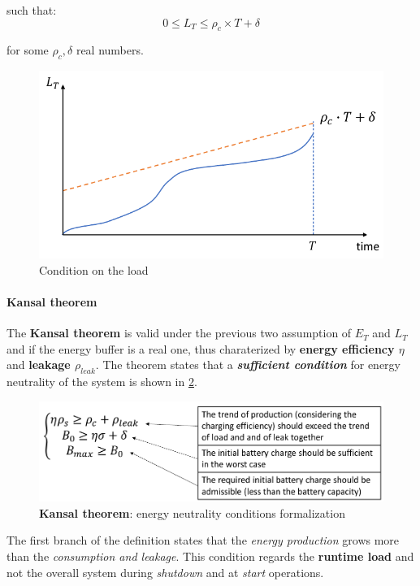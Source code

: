 \documentclass[10pt,a4paper]{report}
\theoremstyle{definition}
\begin{document}
such that:
\begin{equation}
	0 \le L_{T} \le \rho_{c} \times T+\delta
\end{equation}

for some $\rho_{c}, \delta$ real numbers.
\begin{figure}[h]
	\centering\includegraphics[scale=0.30]{images/Pasted image 20230510084605.png}
	\caption{Condition on the load}
	\label{kansal-cond2}
\end{figure}

\paragraph{Kansal theorem}
The \textbf{Kansal theorem} is valid under the previous two assumption of $E_{T}$ and $L_{T}$ and if the energy buffer is a real one, thus charaterized by \textbf{energy efficiency $\eta$} and \textbf{leakage $\rho_{leak}$}.
The theorem states that a \textit{\textbf{sufficient condition}} for energy neutrality of the system is shown in \ref{kansal-theorem}.
\begin{figure}[h]
	\centering
	\includegraphics[scale=0.40]{images/Pasted image 20230509153439.png}
	\caption{\textbf{Kansal theorem}: energy neutrality conditions formalization}
	\label{kansal-theorem}
\end{figure}

The first branch of the definition states that the \textit{energy production} grows more than the \textit{consumption and leakage}. This condition regards the \textbf{runtime load} and not the overall system during \textit{shutdown} and at \textit{start} operations.
\end{document}
